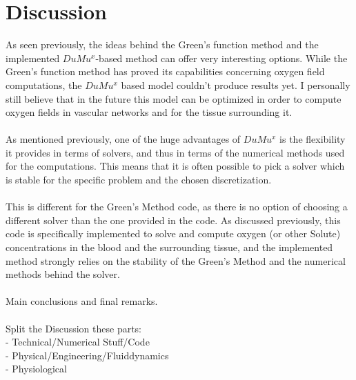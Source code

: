 \newpage
\newpage
\section{Discussion}

As seen previously, the ideas behind the Green's function method and the implemented $DuMu^x$-based method can offer very interesting options. While the Green's function method has proved its capabilities concerning oxygen field computations, the $DuMu^x$ based model couldn't produce results yet. I personally still believe that in the future this model can be optimized in order to compute oxygen fields in vascular networks and for the tissue surrounding it.\\
\\As mentioned previously, one of the huge advantages of $DuMu^x$ is the flexibility it provides in terms of solvers, and thus in terms of the numerical methods used for the computations. This means that it is often possible to pick a solver which is stable for the specific problem and the chosen discretization.
\\
\\This is different for the Green's Method code, as there is no option of choosing a different solver than the one provided in the code. As discussed previously, this code is specifically implemented to solve and compute oxygen (or other Solute) concentrations in the blood and the surrounding tissue, and the implemented method strongly relies on the stability of the Green's Method and the numerical methods behind the solver.
\\
\\Main conclusions and final remarks.
\\
\\Split the Discussion these parts:
\\- Technical/Numerical Stuff/Code
\\- Physical/Engineering/Fluiddynamics
\\- Physiological